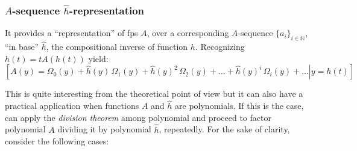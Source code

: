 
\subsubsection{$A$-sequence $\hat{h}$-representation}

It provides a ``representation'' of \ac{fps} $A$, over a corresponding
$A$-sequence $\lbrace a_{i}\rbrace_{i\in\mathbb{N}}$, ``in base'' $\hat{h}$, 
the compositional inverse of function $h$.  Recognizing $h(t)=tA(h(t))$ yield:
\begin{displaymath}
    \left.\left[
        A(y) =  \Omega_{0}(y) + 
        \hat{h}(y)\,\Omega_{1}(y) + \hat{h}(y)^{2}\,\Omega_{2}(y) + \ldots +
        \hat{h}(y)^{i}\,\Omega_{i}(y) + \ldots
        \right| y = h(t) \right]
\end{displaymath}

This is quite interesting from the theoretical point of 
view but it can also have a practical application
when functions $A$ and $\hat{h}$ are polynomials. If this is the case,
can apply the \emph{division theorem} among polynomial and 
proceed to factor polynomial $A$ dividing it by polynomial $\hat{h}$,
repeatedly. For the sake of clarity, consider the following cases:

